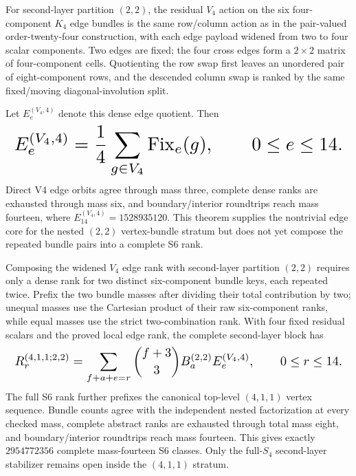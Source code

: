 \documentclass{article}
\newcommand{\fitmath}[1]{\resizebox{0.99\linewidth}{!}{$\displaystyle #1$}}
\begin{document}
For second-layer partition $(2,2)$, the residual $V_4$ action on the six
four-component $K_4$ edge bundles is the same row/column action as in the
pair-valued order-twenty-four construction, with each edge payload widened from
two to four scalar components. Two edges are fixed; the four cross edges form a
$2\times2$ matrix of four-component cells. Quotienting the row swap first
leaves an unordered pair of eight-component rows, and the descended column
swap is ranked by the same fixed/moving diagonal-involution split.

Let $E_e^{(V_4,4)}$ denote this dense edge quotient. Then
\begin{equation}
  \fitmath{%
    E_e^{(V_4,4)}=
      \frac14\sum_{g\in V_4}\operatorname{Fix}_e(g),
    \qquad 0\leq e\leq14.
  }
  \label{eq:optimization-crazy-sextuple-s6-s4-v4-edge-ranking}
\end{equation}
Direct V4 edge orbits agree through mass three, complete dense ranks are
exhausted through mass six, and boundary/interior roundtrips reach mass
fourteen, where $E_{14}^{(V_4,4)}=1528935120$. This theorem supplies the
nontrivial edge core for the nested $(2,2)$ vertex-bundle stratum but does not
yet compose the repeated bundle pairs into a complete S6 rank.

Composing the widened $V_4$ edge rank with second-layer partition $(2,2)$
requires only a dense rank for two distinct six-component bundle keys, each
repeated twice. Prefix the two bundle masses after dividing their total
contribution by two; unequal masses use the Cartesian product of their raw
six-component ranks, while equal masses use the strict two-combination rank.
With four fixed residual scalars and the proved local edge rank, the complete
second-layer block has
\begin{equation}
  \fitmath{%
    R_r^{(4,1,1;2,2)}=
      \sum_{f+a+e=r}{f+3\choose3}
      B_a^{(2,2)}E_e^{(V_4,4)},
    \qquad 0\leq r\leq14.
  }
  \label{eq:optimization-crazy-sextuple-s6-s4-v4-bundle-ranking}
\end{equation}
The full S6 rank further prefixes the canonical top-level $(4,1,1)$ vertex
sequence. Bundle counts agree with the independent nested factorization at
every checked mass, complete abstract ranks are exhausted through total mass
eight, and boundary/interior roundtrips reach mass fourteen. This gives exactly
$2954772356$ complete mass-fourteen S6 classes. Only the full-$S_4$
second-layer stabilizer remains open inside the $(4,1,1)$ stratum.
\end{document}
